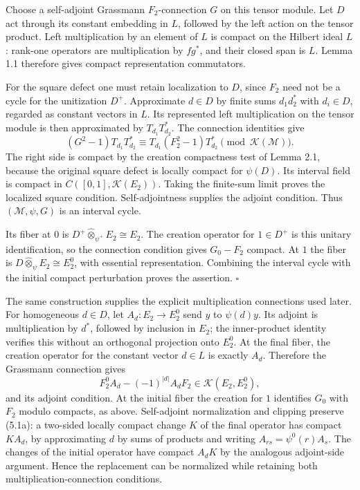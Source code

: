 \documentclass[
  11pt,
]{article}
\begin{document}
Choose a self-adjoint Grassmann \(F_2\)-connection \(G\) on this tensor
module. Let \(D\) act through its constant embedding in \(L\), followed
by the left action on the tensor product. Left multiplication by an
element of \(L\) is compact on the Hilbert ideal \(L\): rank-one
operators are multiplication by \(fg^*\), and their closed span is
\(L\). Lemma 1.1 therefore gives compact representation commutators.

For the square defect one must retain localization to \(D\), since
\(F_2\) need not be a cycle for the unitization \(D^+\). Approximate
\(d\in D\) by finite sums \(d_1d_2^*\) with \(d_i\in D\), regarded as
constant vectors in \(L\). Its represented left multiplication on the
tensor module is then approximated by \(T_{d_1}T_{d_2}^*\). The
connection identities give \[
(G^2-1)T_{d_1}T_{d_2}^*
\equiv T_{d_1}(F_2^2-1)T_{d_2}^*
\pmod{\mathcal K(\mathcal M)}.
\] The right side is compact by the creation compactness test of Lemma
2.1, because the original square defect is locally compact for
\(\psi(D)\). Its interval field is compact in
\(C([0,1],\mathcal K(E_2))\). Taking the finite-sum limit proves the
localized square condition. Self-adjointness supplies the adjoint
condition. Thus \((\mathcal M,\psi,G)\) is an interval cycle.

Its fiber at \(0\) is \(D^+\widehat\otimes_{\psi^+}E_2\cong E_2\). The
creation operator for \(1\in D^+\) is this unitary identification, so
the connection condition gives \(G_0-F_2\) compact. At \(1\) the fiber
is \(D\widehat\otimes_\psi E_2\cong E_2^0\), with essential
representation. Combining the interval cycle with the initial compact
perturbation proves the assertion. \(\square\)

The same construction supplies the explicit multiplication connections
used later. For homogeneous \(d\in D\), let \(A_d:E_2\to E_2^0\) send
\(y\) to \(\psi(d)y\). Its adjoint is multiplication by \(d^*\),
followed by inclusion in \(E_2\); the inner-product identity verifies
this without an orthogonal projection onto \(E_2^0\). At the final
fiber, the creation operator for the constant vector \(d\in L\) is
exactly \(A_d\). Therefore the Grassmann connection gives \[
F_2^0A_d-(-1)^{|d|}A_dF_2
\in\mathcal K(E_2,E_2^0),
\tag{5.1a}
\] and its adjoint condition. At the initial fiber the creation for
\(1\) identifies \(G_0\) with \(F_2\) modulo compacts, as above.
Self-adjoint normalization and clipping preserve (5.1a): a two-sided
locally compact change \(K\) of the final operator has compact \(KA_d\),
by approximating \(d\) by sums of products and writing
\(A_{rs}=\psi^0(r)A_s\). The changes of the initial operator have
compact \(A_dK\) by the analogous adjoint-side argument. Hence the
replacement can be normalized while retaining both
multiplication-connection conditions.
\end{document}
